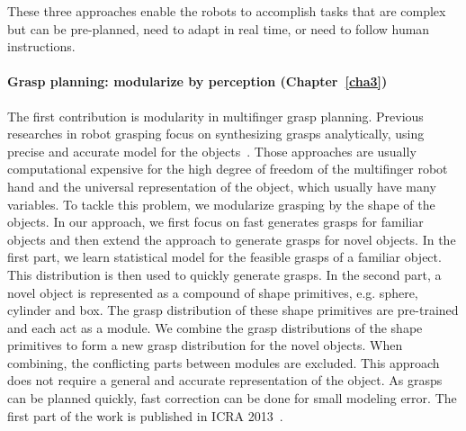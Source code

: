 These three approaches enable the robots to accomplish tasks that are complex but can be pre-planned, need to adapt in real time, or need to follow human instructions.



\paragraph{Grasp planning: modularize by perception (Chapter~\ref{cha3})}
The first contribution is modularity in multifinger grasp planning. Previous researches in robot grasping focus on synthesizing grasps analytically, using precise and accurate model for the objects~\citep{sahbani2011overview}. Those approaches are usually computational expensive for the high degree of freedom of the multifinger robot hand and the universal representation of the object, which usually have many variables. To tackle this problem, we modularize grasping by the shape of the objects. In our approach, we first focus on fast generates grasps for familiar objects and then extend the approach to generate grasps for novel objects. In the first part, we learn statistical model for the feasible grasps of a familiar object. This distribution is then used to quickly generate grasps. In the second part, a novel object is represented as a compound of shape primitives, e.g. sphere, cylinder and box. The grasp distribution of these shape primitives are pre-trained and each act as a module. We combine the grasp distributions of the shape primitives to form a new grasp distribution for the novel objects. When combining, the conflicting parts between modules are excluded.
This approach does not require a general and accurate representation of the object. As grasps can be planned quickly, fast correction can be done for small modeling error. The first part of the work is published in ICRA 2013~\citep{bidan2013grasp}.

